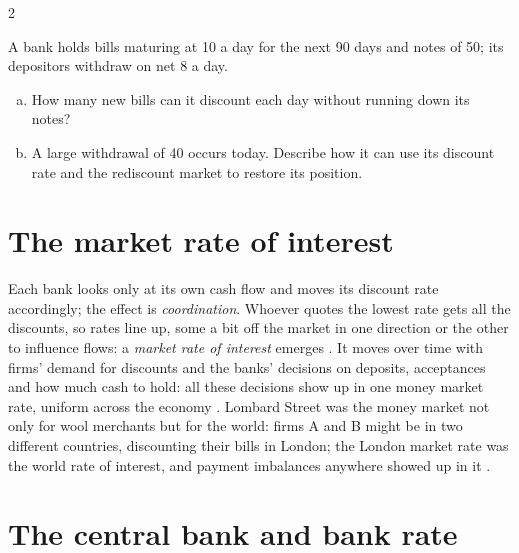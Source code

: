\begin{paracol}{2}
\begin{exercise}
A bank holds bills maturing at 10 a day for the next 90 days and notes of 50; its depositors withdraw on net 8 a day.
\begin{enumerate}[(a)]
  \item How many new bills can it discount each day without running down its notes?
  \item A large withdrawal of 40 occurs today. Describe how it can use its discount rate and the rediscount market to restore its position.
\end{enumerate}
\end{exercise}

\section{The market rate of interest}\label{sec:bg-market}

Each bank looks only at its own cash flow and moves its discount rate accordingly; the effect is \emph{coordination}. Whoever quotes the lowest rate gets all the discounts, so
rates line up, some a bit off the market in one direction or the other to influence flows: a \emph{market rate of interest} emerges . It moves
over time with firms' demand for discounts and the banks' decisions on deposits, acceptances and how much cash to hold: all these decisions show up in one money market rate,
uniform across the economy . Lombard Street was the money market not only for wool merchants but for the world: firms A and B might be in two different
countries, discounting their bills in London; the London market rate was the world rate of interest, and payment imbalances anywhere showed up in it
.

\section{The central bank and bank rate}\label{sec:bg-bankrate}


\end{paracol}
